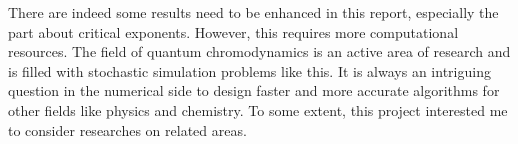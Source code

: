 \documentclass[english, nochinese]{pnote}
\begin{document}
There are indeed some results need to be enhanced in this report, especially the part about critical exponents. However, this requires more computational resources. The field of quantum chromodynamics is an active area of research and is filled with stochastic simulation problems like this. It is always an intriguing question in the numerical side to design faster and more accurate algorithms for other fields like physics and chemistry. To some extent, this project interested me to consider researches on related areas.
\end{document}
